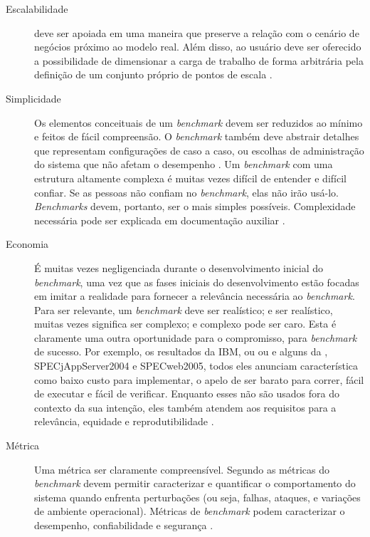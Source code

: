\begin{description}
	\item[Escalabilidade] deve ser apoiada em uma maneira que preserve a relação com o cenário de negócios próximo ao modelo real. Além disso, ao usuário deve ser oferecido a possibilidade de dimensionar a carga de trabalho de forma arbitrária pela definição de um conjunto próprio de pontos de escala \cite{Marco2012}. 
	
	\item[Simplicidade] Os elementos conceituais de um \textit{benchmark} devem ser reduzidos ao mínimo e feitos de fácil compreensão. O \textit{benchmark} também deve abstrair detalhes que representam configurações de caso a caso, ou escolhas de administração do sistema que não afetam o desempenho \cite{Chen2014}. Um \textit{benchmark} com uma estrutura altamente complexa é muitas vezes difícil de entender e difícil confiar. Se as pessoas não confiam no \textit{benchmark}, elas não irão usá-lo. \textit{Benchmarks} devem, portanto, ser o mais simples possíveis. Complexidade necessária pode ser explicada em documentação auxiliar \cite{Weber2014}.
	
	\item[Economia] É muitas vezes negligenciada durante o desenvolvimento inicial do \textit{benchmark}, uma vez que as fases iniciais do desenvolvimento estão focadas em imitar a realidade para fornecer a relevância necessária ao \textit{benchmark}. Para ser relevante, um \textit{benchmark} deve ser realístico; e ser realístico, muitas vezes significa ser complexo; e complexo pode ser caro. Esta é claramente uma outra oportunidade para o compromisso, para \textit{benchmark} de sucesso. Por exemplo, os resultados da IBM,  ou   ou   e alguns da , SPECjAppServer2004 e  SPECweb2005, todos eles anunciam característica como baixo custo para implementar, o apelo de ser barato para correr, fácil de executar e fácil de verificar. Enquanto esses não são usados fora do contexto da sua intenção, eles também atendem aos requisitos para a relevância, equidade e reprodutibilidade \cite{Huppler2009}. 
	
	\item[Métrica] Uma métrica ser claramente compreensível. Segundo  as métricas do \textit{benchmark} devem permitir caracterizar e quantificar o comportamento do sistema quando enfrenta perturbações (ou seja, falhas, ataques, e variações de ambiente operacional). Métricas de \textit{benchmark} podem caracterizar o desempenho, confiabilidade e segurança \cite{Marco2012}.
	
\end{description}

